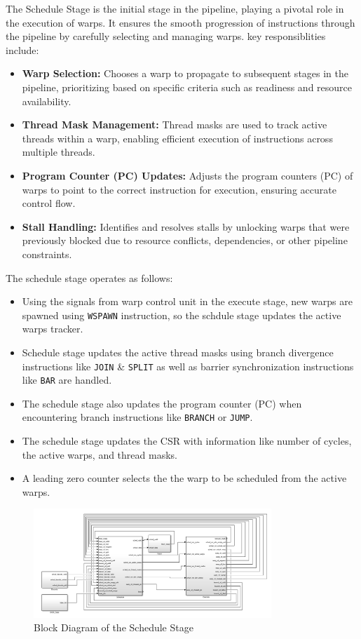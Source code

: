 \documentclass[12pt]{report}
\begin{document}
The Schedule Stage is the initial stage in the pipeline, playing a pivotal role in the execution of warps. It ensures the smooth progression of instructions through the pipeline by carefully selecting and managing warps. key responsiblities include:
\begin{itemize}
    \item \textbf{Warp Selection:} Chooses a warp to propagate to subsequent stages in the pipeline, prioritizing based on specific criteria such as readiness and resource availability.
    \item \textbf{Thread Mask Management:} Thread masks are used to track active threads within a warp, enabling efficient execution of instructions across multiple threads.
    \item \textbf{Program Counter (PC) Updates:} Adjusts the program counters (PC) of warps to point to the correct instruction for execution, ensuring accurate control flow.
    \item \textbf{Stall Handling:} Identifies and resolves stalls by unlocking warps that were previously blocked due to resource conflicts, dependencies, or other pipeline constraints.
\end{itemize}
The schedule stage operates as follows:
\begin{itemize}
    \item Using the signals from warp control unit in the execute stage, new warps are spawned using \texttt{WSPAWN} instruction, so the schdule stage updates the active warps tracker.
    \item Schedule stage updates the active thread masks using branch divergence instructions like \texttt{JOIN} \& \texttt{SPLIT} as well as barrier synchronization instructions like \texttt{BAR} are handled.
    \item The schedule stage also updates the program counter (PC) when encountering branch instructions like \texttt{BRANCH} or \texttt{JUMP}.
    \item The schedule stage updates the CSR with information like number of cycles, the active warps, and thread masks.
    \item A leading zero counter selects the the warp to be scheduled from the active warps.
\end{itemize}
\begin{figure}[H]
    \centering
    \includegraphics[width=0.8\textwidth]{./figures/schedule.png}
    \caption{Block Diagram of the Schedule Stage}
\end{figure}
\end{document}
